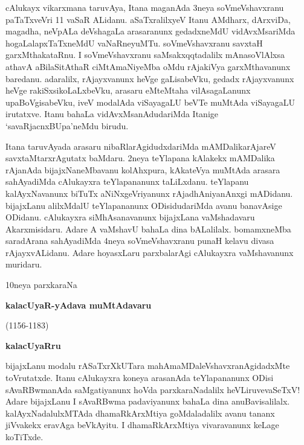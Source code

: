 \documentclass[11pt,a4size]{article}
\begin{document}
cAlukayx vikarxmana taruvAya, Itana maganAda 3neya soVmeVshavxranu
paTaTxveVri 11 vaSaR ALidanu. aSaTxralilxyeV Itanu AMdharx, dArxviDa,
magadha, neVpALa deVshagaLa arasaranunx gedadxneMdU vidAvxMsariMda
hogaLalapxTaTxneMdU vaNaRneyuMTu. soVmeVshavxranu savxtaH
garxMthakataRnu. I soVmeVshavxranu saMsakxqqtadalilx mAnasoVlAlxsa
athavA aBilaSitAthaR ciMtAmaNiyeMba oMdu rAjakiVya garxMthavanunx
baredanu. adaralilx, rAjayxvanunx heVge gaLisabeVku, gedadx
rAjayxvanunx heVge rakiSxsikoLaLxbeVku, arasaru eMteMtaha
vilAsagaLanunx upaBoVgisabeVku, iveV modalAda viSayagaLU beVTe muMtAda
viSayagaLU irutatxve. Itanu bahaLa vidAvxMsanAdudariMda Itanige
`savaRjacnxBUpa'neMdu birudu.

Itana taruvAyada arasaru nibaRlarAgidudxdariMda mAMDalikarAjareV
savxtaMtarxrAgutatx baMdaru. 2neya teYlapana kAlakekx mAMDalika
rAjanAda bijajxNaneMbavanu kolAhxpura, kAkateVya muMtAda arasara
sahAyadiMda cAlukayxra teYlapananunx taLiLxdanu. teYlapanu
kalAyxNavanunx biTuTx aNiNxgeVriyanunx rAjadhAniyanAnxgi
mADidanu. bijajxLanu alilxMdalU teYlapananunx ODisidudariMda avanu
banavAsige ODidanu. cAlukayxra siMhAsanavanunx bijajxLana vaMshadavaru
Akarxmisidaru. Adare A vaMshavU bahaLa dina bALalilalx. bomamxneMba
saradArana sahAyadiMda 4neya soVmeVshavxranu punaH kelavu divasa
rAjayxvALidanu. Adare hoyasxLaru parxbalarAgi cAlukayxra vaMshavanunx
muridaru.

\bigskip

\begin{center}
{\Huge 10neya parxkaraNa}

\smallskip
\textbf{\LARGE kalacUyaR-yAdava muMtAdavaru}

{\Large(1156-1183)}

\smallskip
\textbf{\Large kalacUyaRru}
\end{center} 

bijajxLanu modalu rASaTxrXkUTara mahAmaMDaleVshavxranAgidadxMte
toVrutatxde. Itanu cAlukayxra koneya arasanAda teYlapananunx ODisi
sAvaRBwmanAda saMgatiyanunx hoVda parxkaraNadalilx heVLiruvevaSeTxV!
Adare bijajxLanu I sAvaRBwma padaviyanunx bahaLa dina
anuBavisalilalx. kalAyxNadalulxMTAda dhamaRkArxMtiya goMdaladalilx
avanu tananx jiVvakekx eravAga beVkAyitu. I dhamaRkArxMtiya
vivaravanunx keLage koTiTxde.
\end{document}
